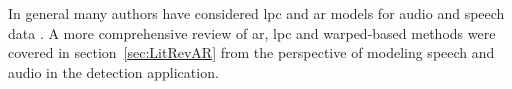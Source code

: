 In general many authors have considered \gls{lpc} and \gls{ar} models for audio and speech data \cite{Vaseghi1990}\cite{Czyzewski1995}\cite{Godsill1998}. A more comprehensive review of \gls{ar}, \gls{lpc} and warped-based methods were covered in section~\ref{sec:LitRevAR} from the perspective of modeling speech and audio in the detection application.

%







